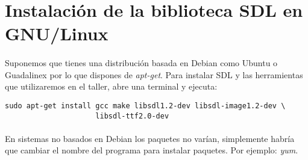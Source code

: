 \documentclass[16pt,spanish]{article}
\title{\titlename}
\author{\authorname}
\def \plpath{.}
\begin{document}









\section{Instalación de la biblioteca SDL en GNU/Linux}
\label{sec:linux}

\paragraph{}
Suponemos que tienes una distribución basada en Debian como Ubuntu o Guadalinex
por lo que dispones de \emph{apt-get}. Para instalar SDL y las herramientas
que utilizaremos en el taller, abre una terminal y ejecuta:

\begin{verbatim}
sudo apt-get install gcc make libsdl1.2-dev libsdl-image1.2-dev \
                     libsdl-ttf2.0-dev
\end{verbatim}

\paragraph{}
En sistemas no basados en Debian los paquetes no varían, simplemente habría
que cambiar el nombre del programa para instalar paquetes. Por ejemplo:
\emph{yum}.
\end{document}
